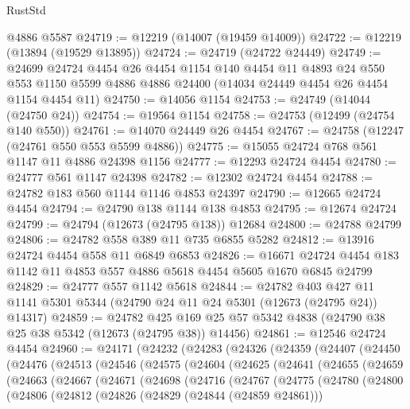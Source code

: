 \begin{lexlean}{RustStd}
\begin{coremodule}
    @4886
    @5587
@24719 := @12219 (@14007 (@19459 @14009))
@24722 := @12219 (@13894 (@19529 @13895))
@24724 := @24719 (@24722 @24449)
@24749 := @24699
    @24724
    @4454
    @26
    @4454
    @1154
    @140
    @4454
    @11
    @4893
    @24
    @550
    @553
    @1150
    @5599
    @4886
    @4886
    @24400
    (@14034 @24449 @4454 @26 @4454 @1154 @4454 @11)
@24750 := @14056 @1154
@24753 := @24749 (@14044 (@24750 @24))
@24754 := @19564 @1154
@24758 := @24753 (@12499 (@24754 @140 @550))
@24761 := @14070 @24449 @26 @4454
@24767 := @24758 (@12247 (@24761 @550 @553 @5599 @4886))
@24775 := @15055 @24724 @768 @561 @1147 @11 @4886 @24398 @1156
@24777 := @12293 @24724 @4454
@24780 := @24777 @561 @1147 @24398
@24782 := @12302 @24724 @4454
@24788 := @24782 @183 @560 @1144 @1146 @4853 @24397
@24790 := @12665 @24724 @4454
@24794 := @24790 @138 @1144 @138 @4853
@24795 := @12674 @24724
@24799 := @24794 (@12673 (@24795 @138)) @12684
@24800 := @24788 @24799
@24806 := @24782 @558 @389 @11 @735 @6855 @5282
@24812 := @13916 @24724 @4454 @558 @11 @6849 @6853
@24826 := @16671 @24724 @4454 @183 @1142 @11 @4853 @557 @4886 @5618 @4454 @5605 @1670 @6845 @24799
@24829 := @24777 @557 @1142 @5618
@24844 := @24782
    @403
    @427
    @11
    @1141
    @5301
    @5344
    (@24790 @24 @11 @24 @5301 (@12673 (@24795 @24)) @14317)
@24859 := @24782
    @425
    @169
    @25
    @57
    @5342
    @4838
    (@24790 @38 @25 @38 @5342 (@12673 (@24795 @38)) @14456)
@24861 := @12546 @24724 @4454
@24960 := @24171
    (@24232
      (@24283
        (@24326
          (@24359
            (@24407
              (@24450
                (@24476
                  (@24513
                    (@24546
                      (@24575
                        (@24604
                          (@24625
                            (@24641
                              (@24655
                                (@24659
                                  (@24663
                                    (@24667
                                      (@24671
                                        (@24698
                                          (@24716
                                            (@24767
                                              (@24775
                                                (@24780
                                                  (@24800
                                                    (@24806
                                                      (@24812
                                                        (@24826
                                                          (@24829 (@24844 (@24859 @24861)))

\end{coremodule}
\end{lexlean}
